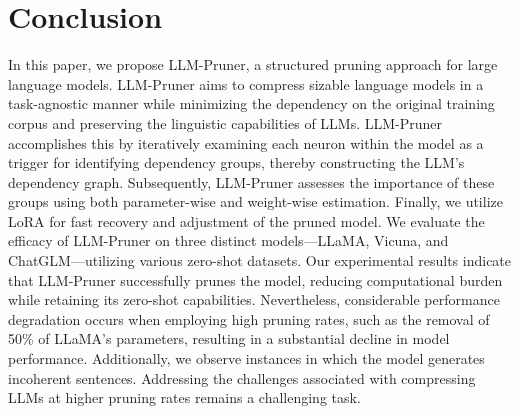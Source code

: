 \documentclass{article}
\begin{document}
\section{Conclusion} 

In this paper, we propose LLM-Pruner, a structured pruning approach for large language models. LLM-Pruner aims to compress sizable language models in a task-agnostic manner while minimizing the dependency on the original training corpus and preserving the linguistic capabilities of LLMs. LLM-Pruner accomplishes this by iteratively examining each neuron within the model as a trigger for identifying dependency groups, thereby constructing the LLM's dependency graph. Subsequently, LLM-Pruner assesses the importance of these groups using both parameter-wise and weight-wise estimation. Finally, we utilize LoRA for fast recovery and adjustment of the pruned model. We evaluate the efficacy of LLM-Pruner on three distinct models—LLaMA, Vicuna, and ChatGLM—utilizing various zero-shot datasets. Our experimental results indicate that LLM-Pruner successfully prunes the model, reducing computational burden while retaining its zero-shot capabilities. Nevertheless, considerable performance degradation occurs when employing high pruning rates, such as the removal of 50\% of LLaMA's parameters, resulting in a substantial decline in model performance. Additionally, we observe instances in which the model generates incoherent sentences. Addressing the challenges associated with compressing LLMs at higher pruning rates remains a challenging task.




\medskip

\clearpage
{
\small


}

\clearpage



\end{document}
